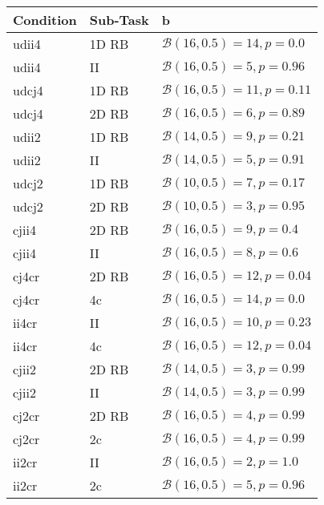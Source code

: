 \begin{tabular}{lll}
\toprule
Condition & Sub-Task & b \\
\midrule
udii4 & 1D RB & $\mathcal{B}(16, 0.5) = 14, p = 0.0$ \\
udii4 & II & $\mathcal{B}(16, 0.5) = 5, p = 0.96$ \\
udcj4 & 1D RB & $\mathcal{B}(16, 0.5) = 11, p = 0.11$ \\
udcj4 & 2D RB & $\mathcal{B}(16, 0.5) = 6, p = 0.89$ \\
udii2 & 1D RB & $\mathcal{B}(14, 0.5) = 9, p = 0.21$ \\
udii2 & II & $\mathcal{B}(14, 0.5) = 5, p = 0.91$ \\
udcj2 & 1D RB & $\mathcal{B}(10, 0.5) = 7, p = 0.17$ \\
udcj2 & 2D RB & $\mathcal{B}(10, 0.5) = 3, p = 0.95$ \\
cjii4 & 2D RB & $\mathcal{B}(16, 0.5) = 9, p = 0.4$ \\
cjii4 & II & $\mathcal{B}(16, 0.5) = 8, p = 0.6$ \\
cj4cr & 2D RB & $\mathcal{B}(16, 0.5) = 12, p = 0.04$ \\
cj4cr & 4c & $\mathcal{B}(16, 0.5) = 14, p = 0.0$ \\
ii4cr & II & $\mathcal{B}(16, 0.5) = 10, p = 0.23$ \\
ii4cr & 4c & $\mathcal{B}(16, 0.5) = 12, p = 0.04$ \\
cjii2 & 2D RB & $\mathcal{B}(14, 0.5) = 3, p = 0.99$ \\
cjii2 & II & $\mathcal{B}(14, 0.5) = 3, p = 0.99$ \\
cj2cr & 2D RB & $\mathcal{B}(16, 0.5) = 4, p = 0.99$ \\
cj2cr & 2c & $\mathcal{B}(16, 0.5) = 4, p = 0.99$ \\
ii2cr & II & $\mathcal{B}(16, 0.5) = 2, p = 1.0$ \\
ii2cr & 2c & $\mathcal{B}(16, 0.5) = 5, p = 0.96$ \\
\bottomrule
\end{tabular}
